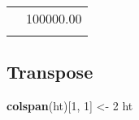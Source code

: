 \documentclass[]{article}
\newenvironment{Shaded}{\begin{snugshade}}{\end{snugshade}}
\newcommand{\KeywordTok}[1]{\textcolor[rgb]{0.13,0.29,0.53}{\textbf{{#1}}}}
\newcommand{\DecValTok}[1]{\textcolor[rgb]{0.00,0.00,0.81}{{#1}}}
\newcommand{\StringTok}[1]{\textcolor[rgb]{0.31,0.60,0.02}{{#1}}}
\newcommand{\NormalTok}[1]{{#1}}
\begin{document}
\begin{table}[h]
\begin{centering}
\begin{tabularx}{0.5\textwidth}{p{} p{}}
\hhline{>{\arrayrulecolor{black}}|>{\arrayrulecolor{black}}->{\arrayrulecolor{black}}|>{\arrayrulecolor{black}}-}
\arrayrulecolor{black}
\multicolumn{1}{|p{0.25\textwidth}|}{\raggedright\rule{0pt}{\baselineskip+4pt}\hspace*{4pt}Thyme\hspace*{4pt}\rule[-4pt]{0pt}{4pt}} & \multicolumn{1}{p{0.25\textwidth}|}{\raggedright\rule{0pt}{\baselineskip+4pt}\hspace*{4pt}100000.00\hspace*{4pt}\rule[-4pt]{0pt}{4pt}} \tabularnewline[-0.5pt]
\hhline{>{\arrayrulecolor{black}}|>{\arrayrulecolor{black}}->{\arrayrulecolor{black}}|>{\arrayrulecolor{black}}-}
\arrayrulecolor{black}
\end{tabularx}
\par\end{centering}
\end{table}

\FloatBarrier

\subsection{Transpose}\label{transpose}

\begin{Shaded}
\begin{Highlighting}[]
\KeywordTok{colspan}\NormalTok{(ht)[}\DecValTok{1}\NormalTok{, }\DecValTok{1}\NormalTok{] <-}\StringTok{ }\DecValTok{2}
\NormalTok{ht}
\end{Highlighting}
\end{Shaded}
\end{document}
